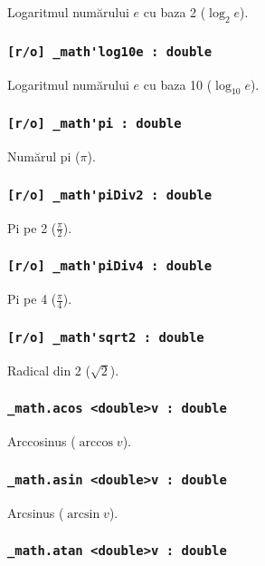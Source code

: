 Logaritmul numărului $e$ cu baza 2 ($\log_{2}{e}$).

\subsubsection{\lstinline|[r/o] _math'log10e : double|}

Logaritmul numărului $e$ cu baza 10 ($\log_{10}{e}$).

\subsubsection{\lstinline|[r/o] _math'pi : double|}

Numărul pi ($\pi$).

\subsubsection{\lstinline|[r/o] _math'piDiv2 : double|}

Pi pe 2 ($\frac{\pi}{2}$).

\subsubsection{\lstinline|[r/o] _math'piDiv4 : double|}

Pi pe 4 ($\frac{\pi}{4}$).

\subsubsection{\lstinline|[r/o] _math'sqrt2 : double|}

Radical din 2 ($\sqrt{2}$).

\subsubsection{\lstinline|_math.acos <double>v : double|}

Arccosinus ($\arccos{v}$).

\subsubsection{\lstinline|_math.asin <double>v : double|}

Arcsinus ($\arcsin{v}$).

\subsubsection{\lstinline|_math.atan <double>v : double|}

